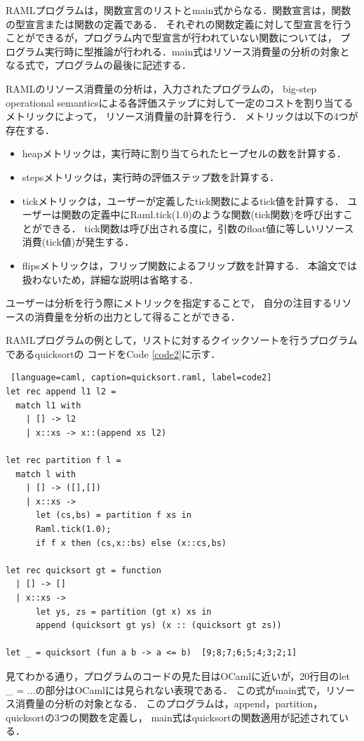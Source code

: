 \documentclass{kuisthesis}
\begin{document}
RAMLプログラムは，関数宣言のリストとmain式からなる．関数宣言は，関数の型宣言または関数の定義である．
それぞれの関数定義に対して型宣言を行うことができるが，プログラム内で型宣言が行われていない関数については，
プログラム実行時に型推論が行われる．main式はリソース消費量の分析の対象となる式で，プログラムの最後に記述する．


RAMLのリソース消費量の分析は，入力されたプログラムの，
big-step operational semanticsによる各評価ステップに対して一定のコストを割り当てるメトリックによって，
リソース消費量の計算を行う．
メトリックは以下の4つが存在する．
\begin{itemize}
  \item heapメトリックは，実行時に割り当てられたヒープセルの数を計算する．
  \item stepsメトリックは，実行時の評価ステップ数を計算する．
  \item tickメトリックは，ユーザーが定義したtick関数によるtick値を計算する．
  ユーザーは関数の定義中にRaml.tick(1.0)のような関数(tick関数)を呼び出すことができる．
  tick関数は呼び出される度に，引数のfloat値に等しいリソース消費(tick値)が発生する．
  \item flipsメトリックは，フリップ関数によるフリップ数を計算する．
  本論文では扱わないため，詳細な説明は省略する．
\end{itemize}

ユーザーは分析を行う際にメトリックを指定することで，
自分の注目するリソースの消費量を分析の出力として得ることができる．

RAMLプログラムの例として，リストに対するクイックソートを行うプログラムであるquicksortの
コードをCode \ref{code2}に示す．

\begin{lstlisting} [language=caml, caption=quicksort.raml, label=code2]
let rec append l1 l2 =
  match l1 with
    | [] -> l2
    | x::xs -> x::(append xs l2)

let rec partition f l =
  match l with
    | [] -> ([],[])
    | x::xs ->
      let (cs,bs) = partition f xs in
      Raml.tick(1.0);
      if f x then (cs,x::bs) else (x::cs,bs)

let rec quicksort gt = function
  | [] -> []
  | x::xs ->
      let ys, zs = partition (gt x) xs in
      append (quicksort gt ys) (x :: (quicksort gt zs))

let _ = quicksort (fun a b -> a <= b)  [9;8;7;6;5;4;3;2;1]
\end{lstlisting}

見てわかる通り，プログラムのコードの見た目はOCamlに近いが，20行目のlet \_ = ...の部分はOCamlには見られない表現である．
この式がmain式で，リソース消費量の分析の対象となる．
このプログラムは，append，partition，quicksortの3つの関数を定義し，
main式はquicksortの関数適用が記述されている．
\end{document}
